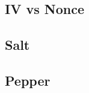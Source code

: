 

\textsf{\small }

\subsection{IV vs Nonce} %

\textsf{\small }

\subsection{Salt} %



\textsf{\small }

\subsection{Pepper} %



\textsf{\small }



